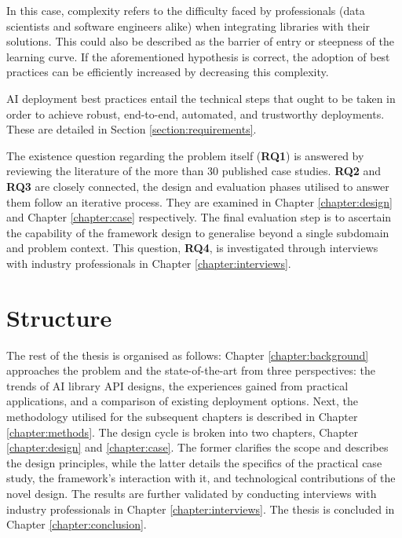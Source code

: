 In this case, complexity refers to the difficulty faced by professionals (data scientists and software engineers alike) when integrating libraries with their solutions. This could also be described as the barrier of entry or steepness of the learning curve. If the aforementioned hypothesis is correct, the adoption of best practices can be efficiently increased by decreasing this complexity.

AI deployment best practices entail the technical steps that ought to be taken in order to achieve robust, end-to-end, automated, and trustworthy deployments. These are detailed in Section \ref{section:requirements}.

The existence question regarding the problem itself (\textbf{RQ1}) is answered by reviewing the literature of the more than 30 published case studies. \textbf{RQ2} and \textbf{RQ3} are closely connected, the design and evaluation phases utilised to answer them follow an iterative process. They are examined in Chapter \ref{chapter:design} and Chapter \ref{chapter:case} respectively. The final evaluation step is to ascertain the capability of the framework design to generalise beyond a single subdomain and problem context. This question, \textbf{RQ4}, is investigated through interviews with industry professionals in Chapter \ref{chapter:interviews}.

\section{Structure}

The rest of the thesis is organised as follows: Chapter \ref{chapter:background} approaches the problem and the state-of-the-art from three perspectives: the trends of AI library API designs, the experiences gained from practical applications, and a comparison of existing deployment options. Next, the methodology utilised for the subsequent chapters is described in Chapter \ref{chapter:methods}. The design cycle is broken into two chapters, Chapter  \ref{chapter:design} and \ref{chapter:case}. The former clarifies the scope and describes the design principles, while the latter details the specifics of the practical case study, the framework's interaction with it, and technological contributions of the novel design. The results are further validated by conducting interviews with industry professionals in Chapter \ref{chapter:interviews}. The thesis is concluded in Chapter \ref{chapter:conclusion}.
